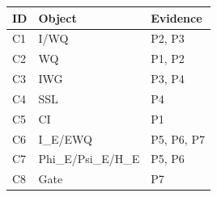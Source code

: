 \begin{tabular}{lll}
\toprule
ID & Object & Evidence \\
\midrule
C1 & I/WQ & P2, P3 \\
C2 & WQ & P1, P2 \\
C3 & IWG & P3, P4 \\
C4 & SSL & P4 \\
C5 & CI & P1 \\
C6 & I\_E/EWQ & P5, P6, P7 \\
C7 & Phi\_E/Psi\_E/H\_E & P5, P6 \\
C8 & Gate & P7 \\
\bottomrule
\end{tabular}
